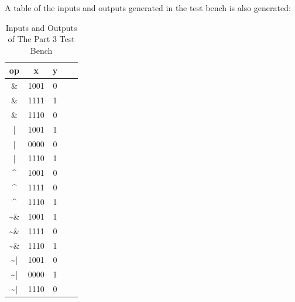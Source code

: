 \documentclass[paper=usletter, fontsize=12pt]{article}
\begin{document}
    A table of the inputs and outputs generated in the test bench is also generated:

    \begin{table}[h]

        \caption{Inputs and Outputs of The Part 3 Test Bench}
        \centering
        \begin{tabular*}{100pt}{@{\extracolsep{\fill}} ccccc}

            \textbf{op} & \textbf{x} & \textbf{y} \\
            \hline
            \& & 1001 & 0 \\
            \& & 1111 & 1 \\
            \& & 1110 & 0 \\
            | & 1001 & 1 \\
            | & 0000 & 0 \\
            | & 1110 & 1 \\
            \textasciicircum & 1001 & 0 \\
            \textasciicircum & 1111 & 0 \\
            \textasciicircum & 1110 & 1 \\
            \textasciitilde \& & 1001 & 1 \\
            \textasciitilde \& & 1111 & 0 \\
            \textasciitilde \& & 1110 & 1 \\
            \textasciitilde | & 1001 & 0 \\
            \textasciitilde | & 0000 & 1 \\
            \textasciitilde | & 1110 & 0 \\
        \end{tabular*}
    \end{table}
\end{document}
